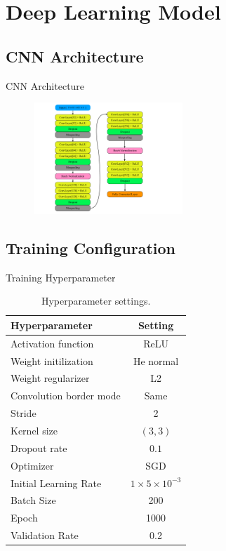 \documentclass{beamer}
\begin{document}
\section{Deep Learning Model}
\subsection{CNN Architecture}
\begin{frame}{CNN Architecture}
\begin{figure}[!h]
        \centering
        \includegraphics[width=0.5\textwidth]{../report/Figures/cnn_arc.pdf}
\end{figure}
\end{frame}

\subsection{Training Configuration}
\begin{frame}{Training Hyperparameter}
\begin{table}[h!]
        \centering
        \begin{tabular}{ l | c  }
            Hyperparameter  & Setting \\ \hline
            Activation function & ReLU \\
            Weight initilization & He normal \\
            Weight regularizer &  L2 \\
            Convolution border mode  & Same \\
            Stride & 2 \\ 
            Kernel size & $(3, 3)$ \\
            Dropout rate & $0.1$ \\
            Optimizer & SGD \\
            Initial Learning Rate & $1\times 5\times10^{-3}$ \\
            Batch Size & 200 \\
            Epoch & 1000 \\
            Validation Rate & 0.2 \\
        \end{tabular}
        \caption{Hyperparameter settings.}
        \label{table:hyper}
\end{table}
\end{frame}
\end{document}
